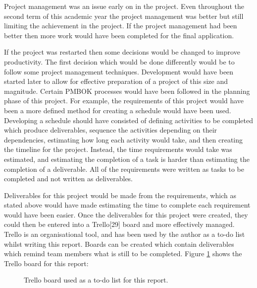 \documentclass{article}
\begin{document}
Project management was an issue early on in the project. Even throughout the second term of this academic year the project management was better but still limiting the achievement in the project. If the project management had been better then more work would have been completed for the final application. \par

If the project was restarted then some decisions would be changed to improve productivity. The first decision which would be done differently would be to follow some project management techniques. Development would have been started later to allow for effective preparation of a project of this size and magnitude. Certain PMBOK processes would have been followed in the planning phase of this project. For example, the requirements of this project would have been a more defined method for creating a schedule would have been used. Developing a schedule should have consisted of defining activities to be completed which produce deliverables, sequence the activities depending on their dependencies, estimating how long each activity would take, and then creating the timeline for the project. Instead, the time requirements would take was estimated, and estimating the completion of a task is harder than estimating the completion of a deliverable. All of the requirements were written as tasks to be completed and not written as deliverables. \par

Deliverables for this project would be made from the requirements, which as stated above would have made estimating the time to complete each requirement would have been easier. Once the deliverables for this project were created, they could then be entered into a Trello[29] board and more effectively managed. Trello is an organisational tool, and has been used by the author as a to-do list whilst writing this report. Boards can be created which contain deliverables which remind team members what is still to be completed. Figure \ref{figure:trelloBoard} shows the Trello board for this report: 

\begin{figure}[H]
	\centering
	\caption{Trello board used as a to-do list for this report.}
	\label{figure:trelloBoard}
\end{figure}
\end{document}

